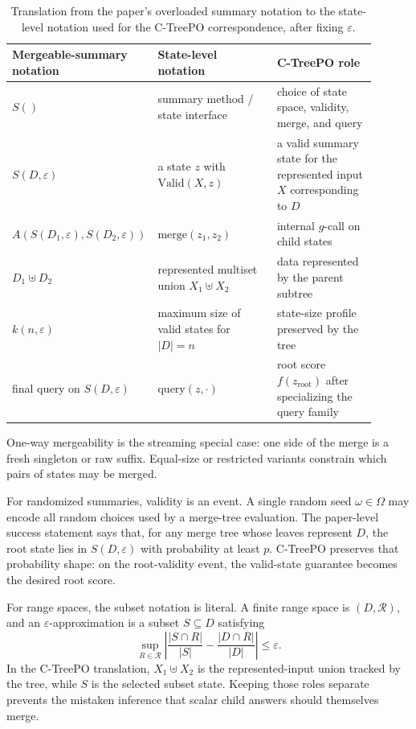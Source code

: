 \begin{table}[t]
\centering
\small
\setlength{\tabcolsep}{4pt}
\begin{tabular}{@{}p{0.28\linewidth}p{0.34\linewidth}p{0.28\linewidth}@{}}
\toprule
Mergeable-summary notation & State-level notation & C-TreePO role \\
\midrule
\(S()\) & summary method / state interface & choice of state space, validity, merge, and query \\
\(S(D,\varepsilon)\) & a state \(z\) with
\(\mathrm{Valid}(X,z)\) & a valid summary state for the represented input \(X\) corresponding to \(D\) \\
\(A(S(D_1,\varepsilon),S(D_2,\varepsilon))\) &
\(\mathrm{merge}(z_1,z_2)\) & internal \(g\)-call on child states \\
\(D_1\uplus D_2\) & represented multiset union \(X_1\uplus X_2\) & data represented by the parent subtree \\
\(k(n,\varepsilon)\) & maximum size of valid states for \(|D|=n\) & state-size profile preserved by the tree \\
final query on \(S(D,\varepsilon)\) &
\(\mathrm{query}(z,\cdot)\) & root score \(f(z_{\mathrm{root}})\) after specializing the query family \\
\bottomrule
\end{tabular}
\caption{Translation from the paper's overloaded summary notation to the
state-level notation used for the C-TreePO correspondence, after fixing
\(\varepsilon\).}
\label{tab:v6-agarwal-translation}
\end{table}

One-way mergeability is the streaming special case: one side of the merge is a
fresh singleton or raw suffix.  Equal-size or restricted variants constrain
which pairs of states may be merged.

For randomized summaries, validity is an event.  A single random seed
\(\omega\in\Omega\) may encode all random choices used by a merge-tree
evaluation.  The paper-level success statement says that, for any merge tree
whose leaves represent \(D\), the root state lies in \(S(D,\varepsilon)\) with
probability at least \(p\).  C-TreePO preserves that probability shape: on the
root-validity event, the valid-state guarantee becomes the desired root score.

For range spaces, the subset notation is literal.  A finite range
space is \((D,\mathcal{R})\), and an \(\varepsilon\)-approximation is a
subset \(S\subseteq D\) satisfying
\[
  \sup_{R\in\mathcal{R}}
  \left|
    \frac{|S\cap R|}{|S|}
    -
    \frac{|D\cap R|}{|D|}
  \right|
  \le \varepsilon.
\]
In the C-TreePO translation, \(X_1\uplus X_2\) is the represented-input union
tracked by the tree, while \(S\) is the selected subset state.  Keeping those
roles separate prevents the mistaken inference that scalar child answers
should themselves merge.

